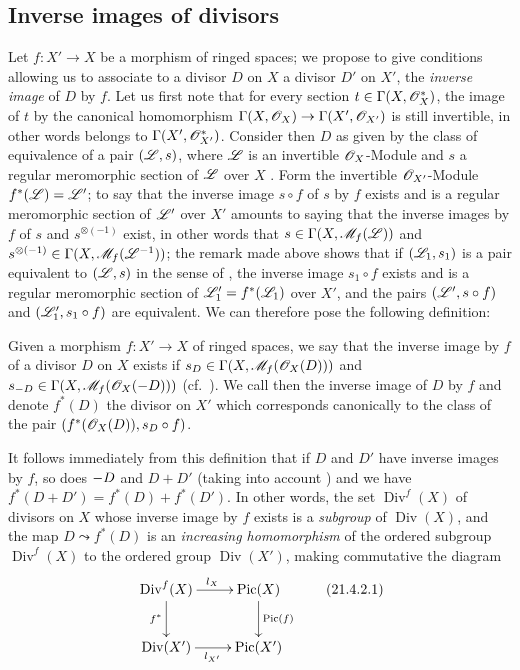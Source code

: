 \subsection{Inverse images of divisors}
\label{subsection:IV.21.4}
\label{IV.21.4}

\begin{env}[21.4.1]
\label{IV.21.4.1}
Let $f:X'\to X$ be a morphism of ringed spaces;
we propose to give conditions allowing us to associate to a divisor $D$ on $X$ a divisor $D'$ on $X'$, the \emph{inverse image} of $D$ by $f$.
Let us first note that for every section $t\in\Gamma(X,\mathscr{O}_X^*)$, the image of $t$ by the canonical homomorphism $\Gamma(X,\mathscr{O}_X)\to\Gamma(X',\mathscr{O}_{X'})$ is still invertible, in other words belongs to $\Gamma(X',\mathscr{O}_{X'}^*)$.
Consider then $D$ as given by the class of equivalence of a pair $(\mathscr{L},s)$, where $\mathscr{L}$ is an invertible $\mathscr{O}_X$-Module and $s$ a regular meromorphic section of $\mathscr{L}$ over $X$ .
Form the invertible $\mathscr{O}_{X'}$-Module $f^*(\mathscr{L})=\mathscr{L}'$;
to say that the inverse image $s\circ f$ of $s$ by $f$ exists  and is a regular meromorphic section of $\mathscr{L}'$ over $X'$ amounts to saying that the inverse images by $f$ of $s$ and $s^{\otimes(-1)}$ exist, in other words that $s\in\Gamma(X,\mathscr{M}_f(\mathscr{L}))$ and $s^{\otimes(-1)}\in\Gamma(X,\mathscr{M}_f(\mathscr{L}^{-1}))$;
the remark made above shows that if $(\mathscr{L}_1,s_1)$ is a pair equivalent to $(\mathscr{L},s)$ in the sense of , the inverse image $s_1\circ f$ exists and is a regular meromorphic section of $\mathscr{L}_1'=f^*(\mathscr{L}_1)$ over $X'$, and the pairs $(\mathscr{L}',s\circ f)$ and $(\mathscr{L}_1',s_1\circ f)$ are equivalent.
We can therefore pose the following definition:
\end{env}

\begin{definition}[21.4.2]
\label{IV.21.4.2}
Given a morphism $f:X'\to X$ of ringed spaces, we say that the inverse image by $f$ of a divisor $D$ on $X$ exists if $s_D\in\Gamma(X,\mathscr{M}_f(\mathscr{O}_X(D)))$ and $s_{-D}\in\Gamma(X,\mathscr{M}_f(\mathscr{O}_X(- D)))$ (cf.\ ).
We call then the inverse image of $D$ by $f$ and denote $f^*(D)$ the divisor on $X'$ which corresponds canonically  to the class of the pair $(f^*(\mathscr{O}_X(D)),s_D\circ f)$.
\end{definition}

It follows immediately from this definition that if $D$ and $D'$ have inverse images by $f$, so does $- D$ and $D+D'$ (taking into account ) and we have
$f^*(D+D')=f^*(D)+f^*(D')$.
In other words, the set $\operatorname{Div}^f(X)$ of divisors on $X$ whose inverse image by $f$ exists is a \emph{subgroup} of $\operatorname{Div}(X)$, and the map $D\leadsto f^*(D)$ is an \emph{increasing homomorphism} of the ordered subgroup $\operatorname{Div}^f(X)$ to the ordered group $\operatorname{Div}(X')$, making commutative the diagram
\[
\label{IV.21.4.2.1}
  \xymatrix{
    \operatorname{Div}^f(X) \ar[r]^{l_X} \ar[d]_{f^*} & \operatorname{Pic}(X) \ar[d]^{\operatorname{Pic}(f)} \\
    \operatorname{Div}(X') \ar[r]_{l_{X'}} & \operatorname{Pic}(X')
  }
  \tag{21.4.2.1}
\]

